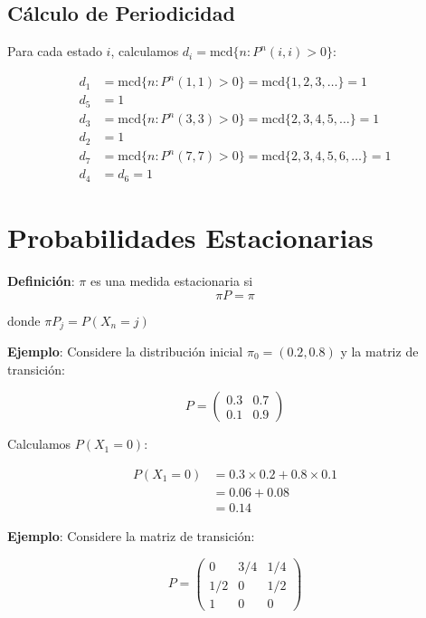 \documentclass[12pt,a4paper]{article}
\begin{document}
\subsection*{Cálculo de Periodicidad}

Para cada estado $i$, calculamos $d_i = \text{mcd} \{n: P^n(i,i) > 0\}$:

\begin{align*}
d_1 &= \text{mcd} \{n: P^n(1,1) > 0\} = \text{mcd} \{1, 2, 3, \dots\} = 1 \\
d_5 &= 1 \\
d_3 &= \text{mcd} \{n: P^n(3,3) > 0\} = \text{mcd} \{2, 3, 4, 5, \dots\} = 1 \\
d_2 &= 1 \\
d_7 &= \text{mcd} \{n: P^n(7,7) > 0\} = \text{mcd} \{2, 3, 4, 5, 6, \dots\} = 1 \\
d_4 &= d_6 = 1
\end{align*}

\section*{Probabilidades Estacionarias}

\textbf{Definición}: $\pi$ es una medida estacionaria si
\begin{equation}
\pi P = \pi
\end{equation}

donde $\pi P_j = P(X_n = j)$

\textbf{Ejemplo}: Considere la distribución inicial $\pi_0 = (0.2, 0.8)$ y la matriz de transición:

\begin{equation*}
P = \begin{pmatrix}
0.3 & 0.7 \\
0.1 & 0.9
\end{pmatrix}
\end{equation*}

Calculamos $P(X_1 = 0)$:

\begin{align*}
P(X_1 = 0) &= 0.3 \times 0.2 + 0.8 \times 0.1 \\
&= 0.06 + 0.08 \\
&= 0.14
\end{align*}

\textbf{Ejemplo}: Considere la matriz de transición:

\begin{equation*}
P = \begin{pmatrix}
0 & 3/4 & 1/4 \\
1/2 & 0 & 1/2 \\
1 & 0 & 0
\end{pmatrix}
\end{equation*}
\end{document}
